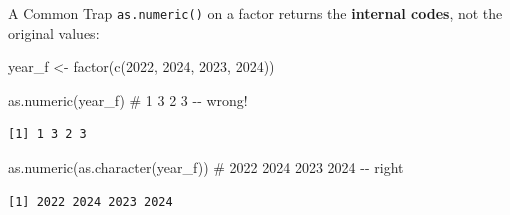 \documentclass[
  ignorenonframetext,
  aspectratio=169,
]{beamer}
\newenvironment{Shaded}{\begin{snugshade}}{\end{snugshade}}
\newcommand{\CommentTok}[1]{\textcolor[rgb]{0.37,0.37,0.37}{#1}}
\newcommand{\DecValTok}[1]{\textcolor[rgb]{0.68,0.00,0.00}{#1}}
\newcommand{\FunctionTok}[1]{\textcolor[rgb]{0.28,0.35,0.67}{#1}}
\newcommand{\NormalTok}[1]{\textcolor[rgb]{0.00,0.23,0.31}{#1}}
\newcommand{\OtherTok}[1]{\textcolor[rgb]{0.00,0.23,0.31}{#1}}
\begin{document}
\begin{frame}[fragile]{A Common Trap}
\protect\hypertarget{a-common-trap}{}
\texttt{as.numeric()} on a factor returns the \textbf{internal codes},
not the original values:

\begin{Shaded}
\begin{Highlighting}[]
\NormalTok{year\_f }\OtherTok{\textless{}{-}} \FunctionTok{factor}\NormalTok{(}\FunctionTok{c}\NormalTok{(}\DecValTok{2022}\NormalTok{, }\DecValTok{2024}\NormalTok{, }\DecValTok{2023}\NormalTok{, }\DecValTok{2024}\NormalTok{))}

\FunctionTok{as.numeric}\NormalTok{(year\_f)                 }\CommentTok{\# 1 3 2 3 {-}{-} wrong!}
\end{Highlighting}
\end{Shaded}

\begin{verbatim}
[1] 1 3 2 3
\end{verbatim}

\begin{Shaded}
\begin{Highlighting}[]
\FunctionTok{as.numeric}\NormalTok{(}\FunctionTok{as.character}\NormalTok{(year\_f))   }\CommentTok{\# 2022 2024 2023 2024 {-}{-} right}
\end{Highlighting}
\end{Shaded}

\begin{verbatim}
[1] 2022 2024 2023 2024
\end{verbatim}
\end{frame}
\end{document}
